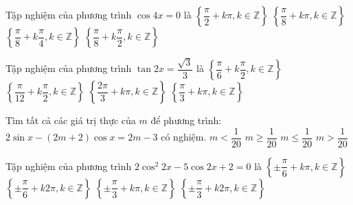 \begin{ex}%
	Tập nghiệm của phương trình $\cos 4x=0$ là
	\choice
	{$\left\{\dfrac{\pi}{2}+k\pi,k\in \mathbb{Z}\right\}$}
	{$\left\{\dfrac{\pi}{8}+k\pi,k\in \mathbb{Z}\right\}$}
	{\True $\left\{\dfrac{\pi}{8}+k\dfrac{\pi}{4},k\in \mathbb{Z}\right\}$}
	{$\left\{\dfrac{\pi}{8}+k\dfrac{\pi}{2},k\in \mathbb{Z}\right\}$}
\end{ex}
\begin{ex}%
	Tập nghiệm của phương trình $\tan 2x=\dfrac{\sqrt{3}}{3}$ là
	\choice
	{$\left\{\dfrac{\pi}{6}+k\dfrac{\pi}{2},k\in \mathbb{Z}\right\}$}
	{\True $\left\{\dfrac{\pi}{12}+k\dfrac{\pi}{2},k\in \mathbb{Z}\right\}$}
	{$\left\{\dfrac{2\pi}{3}+k\pi,k\in \mathbb{Z}\right\}$}
	{$\left\{\dfrac{\pi}{3}+k\pi,k\in \mathbb{Z}\right\}$}
\end{ex}
\begin{ex}%
	Tìm tất cả các giá trị thực của $m$ để phương trình: $2\sin x-\left(2m+2\right)\cos x=2m-3$ có nghiệm.
	\choice
	{$m<\dfrac{1}{20}$}
	{\True $m\ge \dfrac{1}{20}$}
	{$m\le \dfrac{1}{20}$}
	{$m>\dfrac{1}{20}$}
\end{ex}
\begin{ex}%
	Tập nghiệm của phương trình $2\cos^2{2x}-5\cos 2x+2=0$ là
	\choice
	{\True $\left\{\pm \dfrac{\pi}{6}+k\pi,k\in \mathbb{Z}\right\}$}
	{$\left\{\pm \dfrac{\pi}{6}+k2\pi,k\in \mathbb{Z}\right\}$}
	{$\left\{\pm \dfrac{\pi}{3}+k\pi,k\in \mathbb{Z}\right\}$}
	{$\left\{\pm \dfrac{\pi}{3}+k2\pi,k\in \mathbb{Z}\right\}$}
\end{ex}
